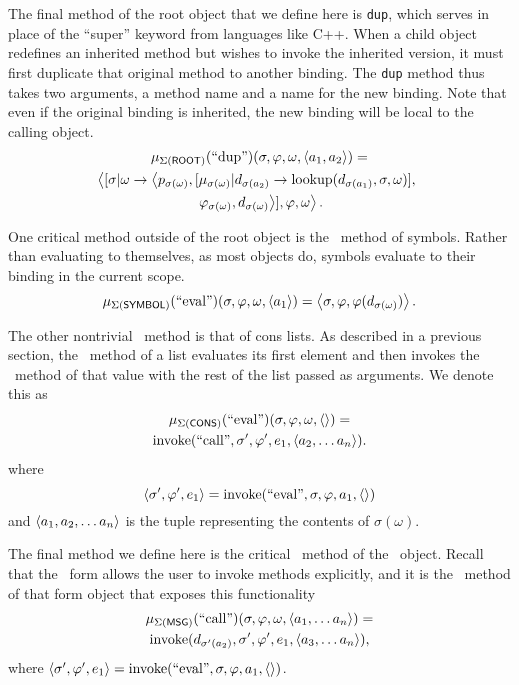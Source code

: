 \documentclass[twocolumn]{article}
\begin{document}
The final method of the root object that we define here is
\texttt{dup}, which serves in place of the ``super'' keyword from
languages like C++. When a child object redefines an inherited method
but wishes to invoke the inherited version, it must first duplicate
that original method to another binding. The \texttt{dup} method thus
takes two arguments, a method name and a name for the new
binding. Note that even if the original binding is inherited, the new
binding will be local to the calling object.
\begin{multline*}
  \mu_{\Sigma(\text{\sf ROOT})}(\text{``dup''})(\sigma,\varphi,\omega,
  \left< a_1,a_2\right>) =\\ \left< [\sigma|\omega\rightarrow \left<
  p_{\sigma(\omega)}, [\mu_{\sigma(\omega)}|d_{\sigma(a_2)}\rightarrow
  \operatorname{lookup}(d_{\sigma(a_1)},\sigma,\omega)],\right.\right.\\\left.\left.
  \varphi_{\sigma(\omega)},
  d_{\sigma(\omega)}\right>],\varphi, \omega\right>.
\end{multline*}

One critical method outside of the root object is the \eval\ method of
symbols. Rather than evaluating to themselves, as most objects do,
symbols evaluate to their binding in the current scope.
\[  \mu_{\Sigma(\text{\sf SYMBOL})}(\text{``eval''})(\sigma,\varphi,\omega,
\left< a_1\right>) = \left< \sigma, \varphi, \varphi(d_{\sigma(\omega)})\right>.\]

The other nontrivial \eval\ method is that of cons lists. As described
in a previous section, the \eval\ method of a list evaluates its first
element and then invokes the \call\ method of that value with the rest
of the list passed as arguments. We denote this as
\begin{multline*}
\mu_{\Sigma(\text{\sf CONS})}(\text{``eval''})(\sigma,\varphi,\omega,
\left<\right>) = \\\operatorname{invoke}(\text{``call''},\sigma',\varphi',e_1,\left< a_2,\ldots
a_n\right>).
\end{multline*}
where 
\[ \left< \sigma',\varphi',e_1\right> =
\operatorname{invoke}(\text{``eval''},\sigma,\varphi,a_1,\left<\right>) \]
and $\left< a_1,a_2,\ldots a_n\right>$ is the tuple representing the
contents of $\sigma(\omega)$.

The final method we define here is the critical \call\ method of the
\msg\ object. Recall that the \msg\ form allows the user to invoke
methods explicitly, and it is the \call\ method of that form object
that exposes this functionality
\begin{multline*}
  \mu_{\Sigma(\text{\sf MSG})}(\text{``call''})(\sigma,\varphi,\omega,
  \left< a_1,\ldots a_n \right>) = \\\operatorname{invoke}( d_{\sigma'(a_2)}, \sigma', \varphi', e_1,
  \left< a_3,\ldots a_n \right>),
\end{multline*}
where $\left< \sigma', \varphi', e_1\right> =
\operatorname{invoke}(\text{``eval''},\sigma,\varphi,a_1,\left<\right>)$.
\end{document}
